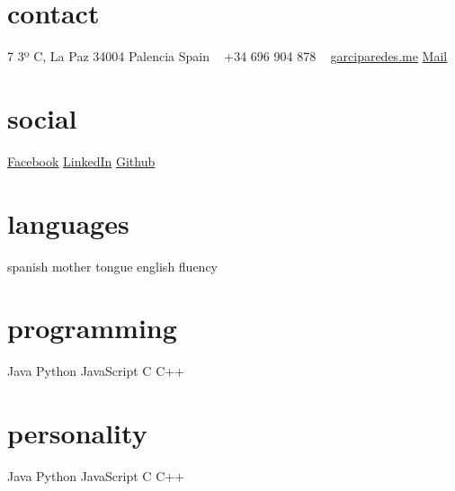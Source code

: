 \documentclass[]{friggeri-cv} %
\begin{document}


\begin{aside} %
\section{contact}
7 3º C, La Paz
34004 Palencia
Spain
~
+34 696 904 878
~
\href{http://garciparedes.me}{garciparedes.me}
\href{mailto:garciparedes@gmail.com}{Mail\quad\faEnvelope} 
\section{social}
\href{http://facebook.com/garciparedes}{Facebook\quad\faFacebookSign} 
\href{http://facebook.com/garciparedes}{LinkedIn\quad\faLinkedinSign } 
\href{http://facebook.com/garciparedes}{Github\quad\faGithubSign } 
\section{languages}
spanish mother tongue
english fluency
\section{programming}
Java\quad{\color{red} $\varheartsuit\varheartsuit\varheartsuit\varheartsuit\varheartsuit$}{\color{black} $\varheartsuit$} 
Python\quad{\color{red} $\varheartsuit\varheartsuit\varheartsuit$}{\color{black} $\varheartsuit\varheartsuit\varheartsuit$} 
JavaScript\quad{\color{red} $\varheartsuit\varheartsuit\varheartsuit\varheartsuit$}{\color{black} $\varheartsuit\varheartsuit$} 
 C\quad{\color{red} $\varheartsuit\varheartsuit\varheartsuit\varheartsuit$}{\color{black} $\varheartsuit\varheartsuit$} 
 C++\quad{\color{red} $\varheartsuit\varheartsuit\varheartsuit\varheartsuit$}{\color{black} $\varheartsuit\varheartsuit$} 
 \section{personality}
Java\quad{\color{blue} $\varheartsuit\varheartsuit\varheartsuit\varheartsuit$}{\color{black} $\varheartsuit\varheartsuit$} 
Python\quad{\color{blue} $\varheartsuit\varheartsuit\varheartsuit\varheartsuit$}{\color{black} $\varheartsuit\varheartsuit$} 
JavaScript\quad{\color{blue} $\varheartsuit\varheartsuit\varheartsuit\varheartsuit$}{\color{black} $\varheartsuit\varheartsuit$} 
 C\quad{\color{blue} $\varheartsuit\varheartsuit\varheartsuit\varheartsuit$}{\color{black} $\varheartsuit\varheartsuit$} 
 C++\quad{\color{blue} $\varheartsuit\varheartsuit\varheartsuit\varheartsuit$}{\color{black} $\varheartsuit\varheartsuit$} 
\end{aside}
\end{document}
